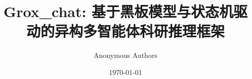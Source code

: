 \documentclass[12pt,a4paper]{article}
\title{\textbf{Grox\_chat: 基于黑板模型与状态机驱动的异构多智能体科研推理框架}}
\author{Anonymous Authors}
\date{\today}
\begin{document}
\maketitle

\begin{abstract}

\end{abstract}









\end{document}
